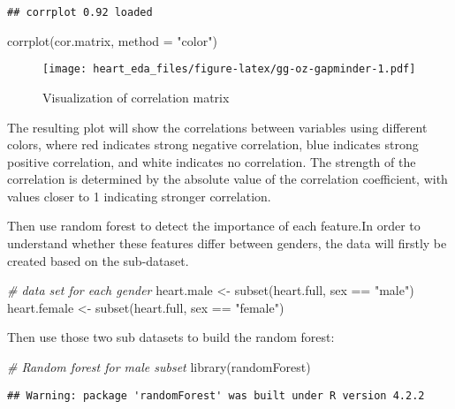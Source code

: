 \documentclass[
]{article}
\newenvironment{Shaded}{\begin{snugshade}}{\end{snugshade}}
\newcommand{\AttributeTok}[1]{\textcolor[rgb]{0.77,0.63,0.00}{#1}}
\newcommand{\CommentTok}[1]{\textcolor[rgb]{0.56,0.35,0.01}{\textit{#1}}}
\newcommand{\FunctionTok}[1]{\textcolor[rgb]{0.00,0.00,0.00}{#1}}
\newcommand{\NormalTok}[1]{#1}
\newcommand{\OtherTok}[1]{\textcolor[rgb]{0.56,0.35,0.01}{#1}}
\newcommand{\SpecialCharTok}[1]{\textcolor[rgb]{0.00,0.00,0.00}{#1}}
\newcommand{\StringTok}[1]{\textcolor[rgb]{0.31,0.60,0.02}{#1}}
\begin{document}
\begin{verbatim}
## corrplot 0.92 loaded
\end{verbatim}

\begin{Shaded}
\begin{Highlighting}[]
\FunctionTok{corrplot}\NormalTok{(cor.matrix, }\AttributeTok{method =} \StringTok{"color"}\NormalTok{)}
\end{Highlighting}
\end{Shaded}

\begin{figure}
\centering
\texttt{[image: heart\_eda\_files/figure-latex/gg-oz-gapminder-1.pdf]}
\caption{Visualization of correlation matrix}
\end{figure}

The resulting plot will show the correlations between variables using
different colors, where red indicates strong negative correlation, blue
indicates strong positive correlation, and white indicates no
correlation. The strength of the correlation is determined by the
absolute value of the correlation coefficient, with values closer to 1
indicating stronger correlation.

Then use random forest to detect the importance of each feature.In order
to understand whether these features differ between genders, the data
will firstly be created based on the sub-dataset.

\begin{Shaded}
\begin{Highlighting}[]
\CommentTok{\# data set for each gender}
\NormalTok{heart.male }\OtherTok{\textless{}{-}} \FunctionTok{subset}\NormalTok{(heart.full, sex }\SpecialCharTok{==} \StringTok{"male"}\NormalTok{)}
\NormalTok{heart.female }\OtherTok{\textless{}{-}} \FunctionTok{subset}\NormalTok{(heart.full, sex }\SpecialCharTok{==} \StringTok{"female"}\NormalTok{)}
\end{Highlighting}
\end{Shaded}

Then use those two sub datasets to build the random forest:

\begin{Shaded}
\begin{Highlighting}[]
\CommentTok{\# Random forest for male subset}
\FunctionTok{library}\NormalTok{(randomForest)}
\end{Highlighting}
\end{Shaded}

\begin{verbatim}
## Warning: package 'randomForest' was built under R version 4.2.2
\end{verbatim}
\end{document}
